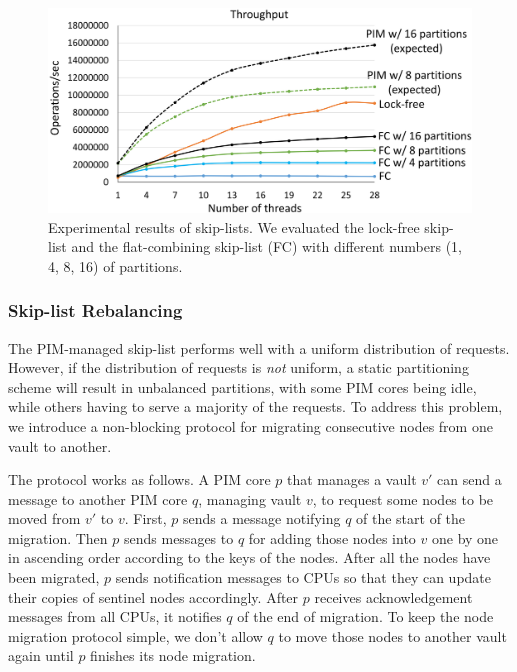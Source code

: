 \begin{figure}[ht!]
    \centering
    \includegraphics[width=1.0\linewidth]{skiplist_data.eps} %
    \caption{Experimental results of skip-lists. We evaluated the lock-free skip-list and 
    the flat-combining skip-list (FC) with different numbers (1, 4, 8, 16) of partitions.}
    \label{figure:skiplist_data}
\end{figure}


\subsubsection{Skip-list Rebalancing}
The PIM-managed skip-list performs well with a uniform distribution of requests.
However, if the distribution of requests is \emph{not} uniform, a static partitioning scheme 
will result in unbalanced partitions, with some PIM cores being idle, while others having to 
serve a majority of the requests. To address this problem, we introduce a non-blocking protocol for 
migrating consecutive nodes from one vault to another. 

The protocol works as follows. 
A PIM core $p$ that manages a vault $v'$ can send a message to another PIM core $q$, managing vault 
$v$, to request some nodes to be moved from $v'$ to $v$. 
First, $p$ sends a message notifying $q$ of the start of the migration. 
Then $p$ sends messages to $q$ for adding those nodes into $v$ one by one in ascending order 
according to the keys of the nodes. 
After all the nodes have been migrated, $p$ sends notification messages to CPUs so that 
they can update their copies of sentinel nodes accordingly.
After $p$ receives acknowledgement messages from all CPUs, it notifies $q$ of the end of migration.
To keep the node migration protocol simple, we don't allow $q$ to move those nodes 
to another vault again until $p$ finishes its node migration. 

